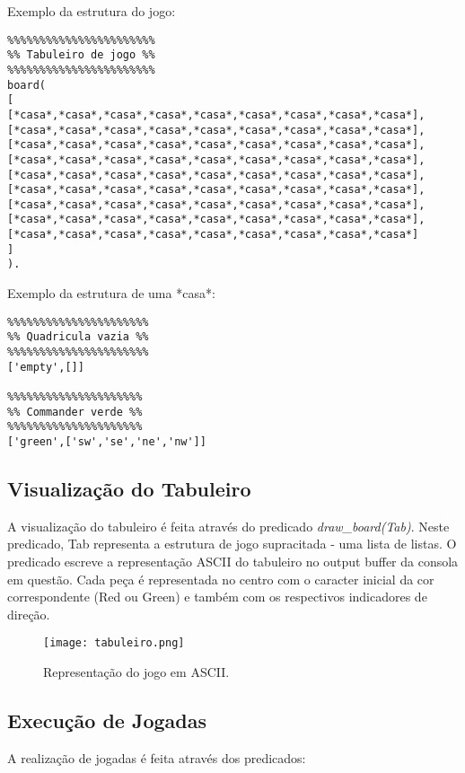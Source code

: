 \documentclass[a4paper]{article}
\begin{document}
Exemplo da estrutura do jogo:
\begin{verbatim}
%%%%%%%%%%%%%%%%%%%%%%%
%% Tabuleiro de jogo %%
%%%%%%%%%%%%%%%%%%%%%%%
board(
[
[*casa*,*casa*,*casa*,*casa*,*casa*,*casa*,*casa*,*casa*,*casa*],
[*casa*,*casa*,*casa*,*casa*,*casa*,*casa*,*casa*,*casa*,*casa*],
[*casa*,*casa*,*casa*,*casa*,*casa*,*casa*,*casa*,*casa*,*casa*],
[*casa*,*casa*,*casa*,*casa*,*casa*,*casa*,*casa*,*casa*,*casa*],
[*casa*,*casa*,*casa*,*casa*,*casa*,*casa*,*casa*,*casa*,*casa*],
[*casa*,*casa*,*casa*,*casa*,*casa*,*casa*,*casa*,*casa*,*casa*],
[*casa*,*casa*,*casa*,*casa*,*casa*,*casa*,*casa*,*casa*,*casa*],
[*casa*,*casa*,*casa*,*casa*,*casa*,*casa*,*casa*,*casa*,*casa*],
[*casa*,*casa*,*casa*,*casa*,*casa*,*casa*,*casa*,*casa*,*casa*]
]
).
\end{verbatim}

Exemplo da estrutura de uma *casa*:
\begin{verbatim}
%%%%%%%%%%%%%%%%%%%%%%
%% Quadricula vazia %%
%%%%%%%%%%%%%%%%%%%%%%
['empty',[]]

%%%%%%%%%%%%%%%%%%%%%
%% Commander verde %%
%%%%%%%%%%%%%%%%%%%%%
['green',['sw','se','ne','nw']]
\end{verbatim}



\subsection{Visualização do Tabuleiro}%
A visualização do tabuleiro é feita através do predicado \textit{draw\_board(Tab)}. Neste predicado, Tab representa a estrutura de jogo supracitada - uma lista de listas. O predicado escreve a representação ASCII do tabuleiro no output buffer da consola em questão. Cada peça é representada no centro com o caracter inicial da cor correspondente (Red ou Green) e também com os respectivos indicadores de direção.

\begin{figure}[ht]
\caption{Representação do jogo em ASCII.}
\centering
\texttt{[image: tabuleiro.png]}
\end{figure}

\subsection{Execução de Jogadas}%
A realização de jogadas é feita através dos predicados:
\end{document}
